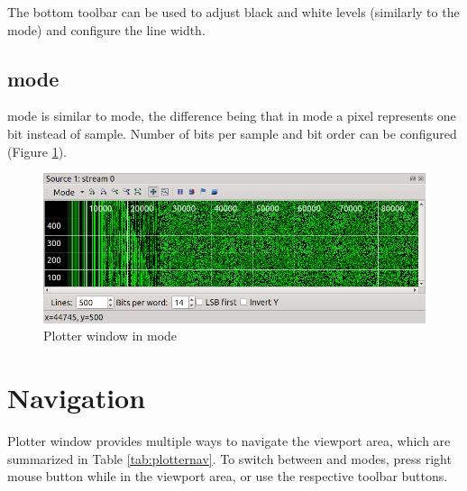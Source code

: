 \documentclass[a4paper,12pt,twoside,extrafontsizes]{memoir}
\begin{document}
The bottom toolbar can be used to adjust black and white levels (similarly to the  mode) and configure the line width.

\subsection{ mode}

 mode is similar to  mode, the difference being that in  mode a pixel represents one bit instead of sample. Number of bits per sample and bit order can be configured (Figure \ref{fig:plotterbinary}).

\begin{figure}[htbp]
\centering
\includegraphics[scale=0.8]{images/plotterbinary.png}
\caption{Plotter window in  mode}
\label{fig:plotterbinary}
\end{figure}

\section{Navigation}

Plotter window provides multiple ways to navigate the viewport area, which are summarized in Table \ref{tab:plotternav}. To switch between  and  modes, press right mouse button while in the viewport area, or use the respective toolbar buttons.
\end{document}
